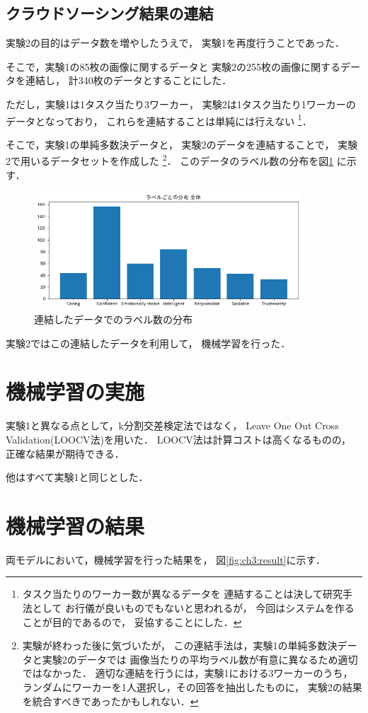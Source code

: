\subsection{クラウドソーシング結果の連結}
実験2の目的はデータ数を増やしたうえで，
実験1を再度行うことであった．

そこで，実験1の85枚の画像に関するデータと
実験2の255枚の画像に関するデータを連結し，
計340枚のデータとすることにした．

ただし，実験1は1タスク当たり3ワーカー，
実験2は1タスク当たり1ワーカーのデータとなっており，
これらを連結することは単純には行えない
\footnote{タスク当たりのワーカー数が異なるデータを
連結することは決して研究手法として
お行儀が良いものでもないと思われるが，
今回はシステムを作ることが目的であるので，
妥協することにした．}．

そこで，実験1の単純多数決データと，
実験2のデータを連結することで，
実験2で用いるデータセットを作成した
\footnote{
実験が終わった後に気づいたが，
この連結手法は，実験1の単純多数決データと実験2のデータでは
画像当たりの平均ラベル数が有意に異なるため適切ではなかった．
適切な連結を行うには，実験1における3ワーカーのうち，
ランダムにワーカーを1人選択し，その回答を抽出したものに，
実験2の結果を統合すべきであったかもしれない．
}．
このデータのラベル数の分布を図\ref{fig:ch3:label_uni}
に示す．
\begin{figure}[tb]
  \centering
  \includegraphics[width=10cm]{ch3/plot_label_uni.png}
  \caption{連結したデータでのラベル数の分布
  \label{fig:ch3:label_uni}}
\end{figure}
実験2ではこの連結したデータを利用して，
機械学習を行った．

\section{機械学習の実施}
実験1と異なる点として，k分割交差検定法ではなく，
Leave One Out Cross Validation(LOOCV法)を用いた．
LOOCV法は計算コストは高くなるものの，
正確な結果が期待できる．

他はすべて実験1と同じとした．
\section{機械学習の結果}
両モデルにおいて，機械学習を行った結果を，
図\ref{fig:ch3:result}に示す．

